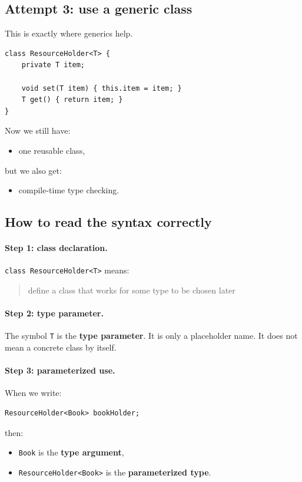 \documentclass[11pt]{article}
\begin{document}
\subsection{Attempt 3: use a generic class}
This is exactly where generics help.

\begin{lstlisting}
class ResourceHolder<T> {
    private T item;

    void set(T item) { this.item = item; }
    T get() { return item; }
}
\end{lstlisting}

Now we still have:
\begin{itemize}
  \item one reusable class,
\end{itemize}
but we also get:
\begin{itemize}
  \item compile-time type checking.
\end{itemize}

\subsection{How to read the syntax correctly}
\paragraph{Step 1: class declaration.}
\texttt{class ResourceHolder<T>} means:
\begin{quote}
define a class that works for some type to be chosen later
\end{quote}

\paragraph{Step 2: type parameter.}
The symbol \texttt{T} is the \textbf{type parameter}.
It is only a placeholder name.
It does not mean a concrete class by itself.

\paragraph{Step 3: parameterized use.}
When we write:
\begin{lstlisting}
ResourceHolder<Book> bookHolder;
\end{lstlisting}
then:
\begin{itemize}
  \item \texttt{Book} is the \textbf{type argument},
  \item \texttt{ResourceHolder<Book>} is the \textbf{parameterized type}.
\end{itemize}
\end{document}
